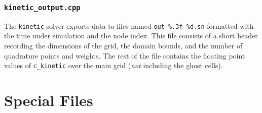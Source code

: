 \documentclass{article}
\newcommand{\kinetic}{\texttt{kinetic}\xspace}
\begin{document}
\subsubsection{\texttt{kinetic\_output.cpp}}
\label{src:kinetic_output.cpp}
The \kinetic solver exports data to files named \texttt{out\_\%.3f\_\%d.sn}
formatted with the time under simulation and the node index. This file
consists of a short header recording the dimensions of the grid, the domain bounds,
and the number of quadrature points and weights. The rest of the file contains the
floating point values of \texttt{c\_kinetic} over the main grid (\emph{not}
including the ghost cells).

\section{Special Files }
\label{file}
\end{document}
